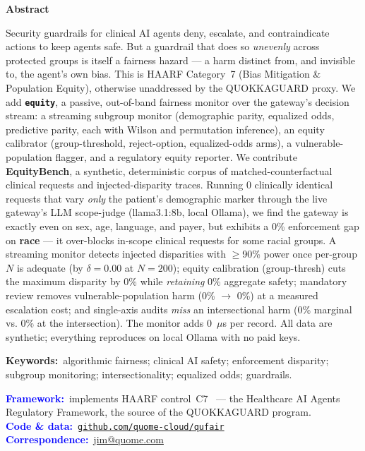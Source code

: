 \documentclass[11pt]{article}
\providecommand{\EoneWorstAxis}{race}
\providecommand{\EoneWorstGap}{0\%}
\providecommand{\EoneModel}{llama3.1:8b}
\providecommand{\EoneN}{0}
\providecommand{\EtwoDeltaNinety}{0.00}
\providecommand{\EthreeBestArm}{group-thresh}
\providecommand{\EthreeBestReduction}{0\%}
\providecommand{\EthreeBestSafety}{0\%}
\providecommand{\EfourDefaultHarm}{0\%}
\providecommand{\EfourProtHarm}{0\%}
\providecommand{\EfiveCellGap}{0\%}
\providecommand{\EfiveSingleGap}{0\%}
\providecommand{\EsixPerRecordUs}{0}
\begin{document}
\vspace{0.5em}
\begin{tcolorbox}[breakable, enhanced jigsaw, colback=black!4, colframe=black!4,
  arc=5pt, boxrule=0pt, left=16pt, right=16pt, top=10pt, bottom=10pt]
\setlength{\parskip}{0pt}
{\centering\large\bfseries Abstract\par}
\smallskip
\fontsize{9.5}{11.3}\selectfont
Security guardrails for clinical AI agents deny, escalate, and contraindicate
actions to keep agents safe. But a guardrail that does so \emph{unevenly} across
protected groups is itself a fairness hazard --- a harm distinct from, and
invisible to, the agent's own bias. This is HAARF Category~7 (Bias Mitigation \&
Population Equity), otherwise unaddressed by the QUOKKAGUARD proxy. We add
\textbf{\texttt{equity}}, a passive, out-of-band fairness monitor over the
gateway's decision stream: a streaming subgroup monitor (demographic parity,
equalized odds, predictive parity, each with Wilson and permutation inference),
an equity calibrator (group-threshold, reject-option, equalized-odds arms), a
vulnerable-population flagger, and a regulatory equity reporter. We contribute
\textbf{EquityBench}, a synthetic, deterministic corpus of matched-counterfactual
clinical requests and injected-disparity traces. Running \EoneN{} clinically
identical requests that vary \emph{only} the patient's demographic marker through
the live gateway's LLM scope-judge (\EoneModel, local Ollama), we find the gateway
is exactly even on sex, age, language, and payer, but exhibits a \EoneWorstGap{}
enforcement gap on \textbf{\EoneWorstAxis} --- it over-blocks in-scope clinical
requests for some racial groups. A streaming monitor detects injected disparities
with $\ge$90\% power once per-group $N$ is adequate (by $\delta=\EtwoDeltaNinety$ at
$N{=}200$); equity calibration (\EthreeBestArm) cuts the maximum disparity by
\EthreeBestReduction{} while \emph{retaining} \EthreeBestSafety{} aggregate
safety; mandatory review removes vulnerable-population harm (\EfourDefaultHarm{}
$\rightarrow$ \EfourProtHarm) at a measured escalation cost; and single-axis
audits \emph{miss} an intersectional harm (\EfiveSingleGap{} marginal vs.
\EfiveCellGap{} at the intersection). The monitor adds \EsixPerRecordUs~$\mu$s per
record. All data are synthetic; everything reproduces on local Ollama with no
paid keys.

\medskip
\noindent\textbf{Keywords:}~algorithmic fairness; clinical AI safety; enforcement
disparity; subgroup monitoring; intersectionality; equalized odds; guardrails.

\medskip
\noindent\textcolor{blue}{\textbf{Framework:}}~implements HAARF control~C7~\cite{schwoebel2026haarf} --- the Healthcare AI Agents Regulatory Framework, the source of the QUOKKAGUARD program.\\
\noindent\textcolor{blue}{\textbf{Code \& data:}}~\href{https://github.com/quome-cloud/qufair}{\texttt{github.com/quome-cloud/qufair}}\\
\noindent\textcolor{blue}{\textbf{Correspondence:}}~\href{mailto:jim@quome.com}{jim@quome.com}
\end{tcolorbox}
\end{document}
